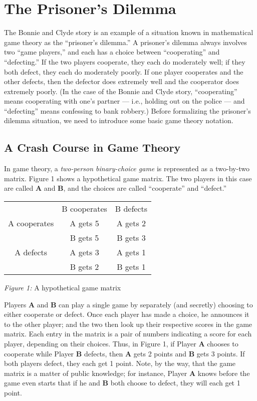 \section{The Prisoner's Dilemma}

The Bonnie and Clyde story is an example of a situation known in
mathematical game theory as the ``prisoner's dilemma.'' A prisoner's
dilemma always involves two ``game players,'' and each has a choice
between ``cooperating'' and ``defecting.'' If the two players
cooperate, they each do moderately well; if they both defect, they
each do moderately poorly. If one player cooperates and the other
defects, then the defector does extremely well and the cooperator does
extremely poorly. (In the case of the Bonnie and Clyde story,
``cooperating'' means cooperating with one's partner --- i.e., holding
out on the police --- and ``defecting'' means confessing to bank
robbery.) Before formalizing the prisoner's dilemma situation, we need
to introduce some basic game theory notation.


\subsection{A Crash Course in Game Theory}

In game theory, a {\it two-person binary-choice game} is represented
as a two-by-two matrix. Figure 1 shows a hypothetical game matrix.
The two players in this case are called {\bf A} and {\bf B}, and
the choices are called ``cooperate'' and ``defect.''

\begin{center}
\begin{tabular}{c|c|c|}
             & B cooperates   & B defects  \\
\cline{2-3}
A cooperates & A gets 5       & A gets 2   \\
             & B gets 5       & B gets 3   \\
\cline{2-3}
A defects    & A gets 3       & A gets 1 \\
             & B gets 2       & B gets 1 \\
\cline{2-3}
\end{tabular}
\end{center}

\centerline{{\it Figure 1:\/} A hypothetical game matrix}

Players {\bf A} and {\bf B} can play a single game by separately (and
secretly) choosing to either cooperate or defect. Once each player has
made a choice, he announces it to the other player; and the two then
look up their respective scores in the game matrix.  Each entry in the
matrix is a pair of numbers indicating a score for each player,
depending on their choices. Thus, in Figure 1, if Player {\bf A}
chooses to cooperate while Player {\bf B} defects, then {\bf A} gets 2
points and {\bf B} gets 3 points. If both players defect, they each
get 1 point. Note, by the way, that the game matrix is a matter of
public knowledge; for instance, Player {\bf A} knows before the game
even starts that if he and {\bf B} both choose to defect, they will
each get 1 point.

